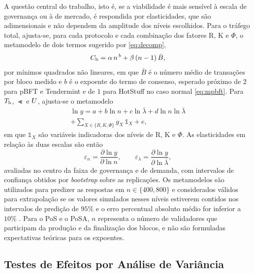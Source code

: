 A questão central do trabalho, isto é, se a viabilidade é mais sensível à escala de governança ou à de mercado, é respondida por elasticidades, que são adimensionais e não dependem da amplitude dos níveis escolhidos. Para o tráfego total, ajusta-se, para cada protocolo e cada combinação dos fatores R, K e $\Phi$, o metamodelo de dois termos sugerido por \eqref{eq:decomp},
\begin{equation}
C_{\mathrm{b}} = \alpha\, n^{\,b} + \beta\, (n-1)\, \bar{B},
\label{eq:cbmodel}
\end{equation}
por mínimos quadrados não lineares, em que $\bar{B}$ é o número médio de transações por bloco medido e $b$ é o expoente do termo de consenso, esperado próximo de $2$ para pBFT e Tendermint e de $1$ para HotStuff no caso normal \eqref{eq:mpbft}. Para $T_{\mathrm{b}}$, $\Lt$ e $U$, ajusta-se o metamodelo
\begin{multline}
\ln y = a + b \ln n + c \ln \bar{\lambda} + d \ln n \ln \bar{\lambda} \\
+ \textstyle\sum_{X \in \{R, K, \Phi\}} g_{X}\, \mathbb{1}_{X} + e,
\label{eq:scaling}
\end{multline}
em que $\mathbb{1}_{X}$ são variáveis indicadoras dos níveis de R, K e $\Phi$. As elasticidades em relação às duas escalas são então
\begin{equation}
\varepsilon_{n} = \frac{\partial \ln y}{\partial \ln n}, \qquad \varepsilon_{\lambda} = \frac{\partial \ln y}{\partial \ln \bar{\lambda}},
\label{eq:elast}
\end{equation}
avaliadas no centro da faixa de governança e de demanda, com intervalos de confiança obtidos por \textit{bootstrap} sobre as replicações. Os metamodelos são utilizados para predizer as respostas em $n \in \{400, 800\}$ e considerados válidos para extrapolação se os valores simulados nesses níveis estiverem contidos nos intervalos de predição de $95\%$ e o erro percentual absoluto médio for inferior a $10\%$ \citep{Kleijnen2015}.  Para o PoS e o PoSA, $n$ representa o número de validadores que participam da produção e da finalização dos blocos, e não são formuladas expectativas teóricas para os expoentes.

\subsection{Testes de Efeitos por Análise de Variância}

